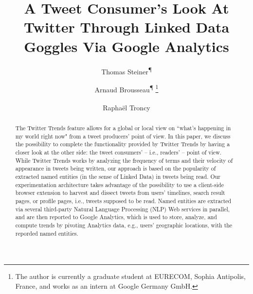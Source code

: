 \documentclass[runningheads,a4paper]{llncs}
\begin{document}
\mainmatter  %

\title{A Tweet Consumer's Look At Twitter Through Linked Data Goggles Via Google Analytics}


%
%
\author{Thomas Steiner\textsuperscript{\P} \and Arnaud Brousseau\textsuperscript{\P\dag}%
\thanks{The author is currently a graduate student at EURECOM, Sophia Antipolis, France, and works as an intern at Google Germany GmbH.}%
\and Rapha\"{e}l Troncy\textsuperscript{\dag}}

%
%


\maketitle

\begin{abstract}
The Twitter Trends feature allows for a global or local view on ``what's happening in my world right now" from a tweet producers' point of view. In this paper, we discuss the possibility to complete the functionality provided by Twitter Trends by having a closer look at the other side: the tweet consumers' -- i.e., readers' -- point of view. While Twitter Trends works by analyzing the frequency of terms and their velocity of appearance in tweets being written, our approach is based on the popularity of extracted named entities (in the sense of Linked Data) in tweets being read. Our experimentation architecture takes advantage of the possibility to use a client-side browser extension to harvest and dissect tweets from users' timelines, search result pages, or profile pages, i.e., tweets supposed to be read. Named entities are extracted via several third-party Natural Language Processing (NLP) Web services in parallel, and are then reported to Google Analytics, which is used to store, analyze, and compute trends by pivoting Analytics data, e.g., users' geographic locations, with the reporded named entities.
\end{abstract}
\end{document}
